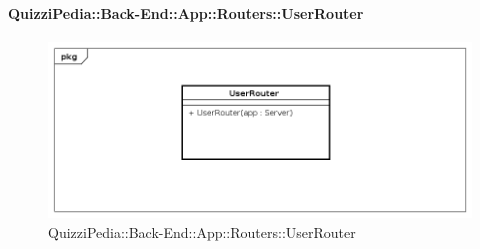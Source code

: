 \paragraph{QuizziPedia::Back-End::App::Routers::UserRouter}
\label{QuizziPedia::Back-End::App::Routers::UserRouter}
\begin{figure}[ht]
	\centering
	\includegraphics[scale=0.45]{UML/Classi/Back-End/QuizziPedia_Back-End_App_Routers_UserRouter.png}
	\caption{QuizziPedia::Back-End::App::Routers::UserRouter}
\end{figure}
\FloatBarrier

